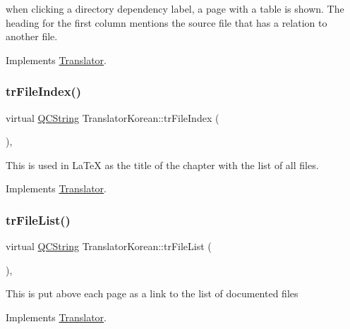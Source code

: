 when clicking a directory dependency label, a page with a table is shown. The heading for the first column mentions the source file that has a relation to another file. 

Implements \mbox{\hyperlink{class_translator}{Translator}}.

\mbox{\label{class_translator_korean_a37bf65384fea26de2c044141a5b9ee74}} 
\subsubsection{\texorpdfstring{trFileIndex()}{trFileIndex()}}
{\footnotesize\ttfamily virtual \mbox{\hyperlink{class_q_c_string}{Q\+C\+String}} Translator\+Korean\+::tr\+File\+Index (\begin{DoxyParamCaption}{ }\end{DoxyParamCaption})\hspace{0.3cm}{\ttfamily [inline]}, {\ttfamily [virtual]}}

This is used in La\+TeX as the title of the chapter with the list of all files. 

Implements \mbox{\hyperlink{class_translator}{Translator}}.

\mbox{\label{class_translator_korean_ad87384a8302368da89285245ac81e506}} 
\subsubsection{\texorpdfstring{trFileList()}{trFileList()}}
{\footnotesize\ttfamily virtual \mbox{\hyperlink{class_q_c_string}{Q\+C\+String}} Translator\+Korean\+::tr\+File\+List (\begin{DoxyParamCaption}{ }\end{DoxyParamCaption})\hspace{0.3cm}{\ttfamily [inline]}, {\ttfamily [virtual]}}

This is put above each page as a link to the list of documented files 

Implements \mbox{\hyperlink{class_translator}{Translator}}.

\mbox{\label{class_translator_korean_ab73b0ce0feb86a606ca11afaaffa6500}} 
